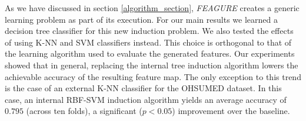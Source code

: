 \documentclass{article}
\theoremstyle{definition}
\begin{document}
As we have discussed in section \ref{algorithm_section}, \emph{FEAGURE} creates a generic learning problem as part of its execution. For our main results we learned a decision tree classifier for this new induction problem.
We also tested the effects of using K-NN and SVM classifiers instead. %
This choice is orthogonal to that of the learning algorithm used to evaluate the generated features.
Our experiments showed that in general, replacing the internal tree induction algorithm lowers the achievable accuracy of the resulting feature map.
The only exception to this trend is the case of an external K-NN classifier for the OHSUMED dataset. In this case, an internal RBF-SVM induction algorithm yields an average accuracy of $0.795$ (across ten folds), a significant ($p<0.05$) improvement over the baseline. 

		
		
		
		
		
\end{document}

